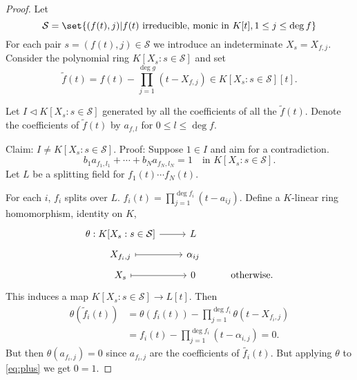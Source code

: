 \documentclass{article}
\begin{document}
\begin{proof}
    Let
    \begin{equation*}
        \mathcal{S} = \set{(f(t),j) | f(t) \text{ irreducible, monic in } K[t], 1 \leq j \leq \deg f}
    \end{equation*}
    For each pair $s = (f(t),j) \in \mathcal{S}$ we introduce an indeterminate $X_s = X_{f,j}$.
    Consider the polynomial ring $K[X_s: s \in \mathcal{S}]$ and set
    \begin{equation*}\tilde{f}(t) = f(t) - \prod_{j=1}^{\deg g} (t - X_{f,j}) \in K[X_s: s \in \mathcal{S}][t].\end{equation*}

    Let $I \lhd K[X_s : s \in \mathcal{S}]$ generated by all the coefficients of all the $\tilde{f}(t)$.
    Denote the coefficients of $\tilde{f}(t)$ by $a_{f,l}$ for $0 \leq l \leq \deg f$.

    Claim: $I \neq K[X_s : s \in \mathcal{S}]$.
    Proof: Suppose $1 \in I$ and aim for a contradiction.
    \begin{equation*}
        b_1 a_{f_1,l_1} + \dotsb + b_N a_{f_N,l_N} = 1 \quad \text{in } K[X_s : s \in \mathcal{S}]. \tag{$+$} \label{eq:plus}
    \end{equation*}
    Let $L$ be a splitting field for $f_1(t) \dotsm f_N(t)$.

    For each $i$, $f_i$ splits over $L$. $f_i(t) = \prod_{j=1}^{\deg f_i} (t-a_{ij})$.
    Define a $K$-linear ring homomorphism, identity on $K$,
    \begin{equation*}
        \begin{tikzcd}[row sep=tiny]
            \theta: K[X_s : s \in \mathcal{S}] \rar & L \\
            X_{f_i,j} \rar[maps to] & \alpha_{ij} \\
            X_s \rar[maps to] & 0 & \text{otherwise}.
        \end{tikzcd}
    \end{equation*}
    This induces a map $K[X_s : s \in \mathcal{S}] \to L[t]$.
    Then
    \begin{align*}
        \theta(\tilde{f}_i(t)) &= \theta(f_i(t)) - \prod_{j=1}^{\deg f_i} \theta(t - X_{f_i,j}) \\
                               &= f_i(t) - \prod_{j=1}^{\deg f_i} (t - \alpha_{i,j}) = 0.
    \end{align*}
    But then $\theta(a_{f_i,j}) = 0$ since $a_{f_i,j}$ are the coefficients of $\tilde{f_i}(t)$.
    But applying $\theta$ to \eqref{eq:plus} we get $0=1$.


\end{proof}
\end{document}
